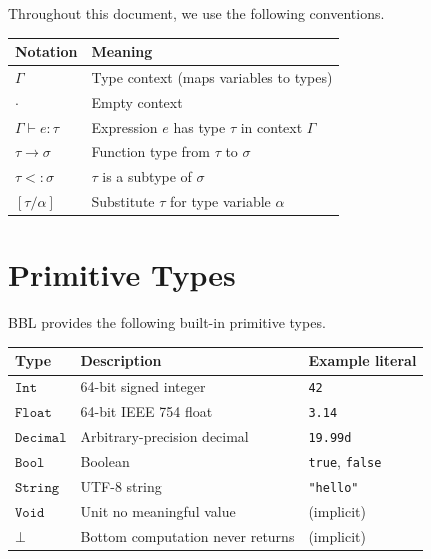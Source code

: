 \documentclass[11pt, letterpaper]{article}
\newcommand{\hastype}[3]{#1 \vdash #2 : #3}
\newcommand{\ctx}{\Gamma}
\newcommand{\emptyctx}{\cdot}
\newcommand{\tvar}{\alpha}          %
\newcommand{\typ}{\tau}             %
\newcommand{\typB}{\sigma}          %
\newcommand{\tInt}{\mathtt{Int}}
\newcommand{\tFloat}{\mathtt{Float}}
\newcommand{\tDecimal}{\mathtt{Decimal}}
\newcommand{\tBool}{\mathtt{Bool}}
\newcommand{\tString}{\mathtt{String}}
\newcommand{\tVoid}{\mathtt{Void}}
\newcommand{\tBottom}{\bot}
\newcommand{\tarrow}[2]{#1 \to #2}             %
\newcommand{\subtype}{\mathrel{<:}}
\newcommand{\subst}[2]{[#1 / #2]}
\begin{document}
Throughout this document, we use the following conventions.

\begin{center}
\begin{tabular}{ll}
  \toprule
  \textbf{Notation} & \textbf{Meaning} \\
  \midrule
  $\ctx$                          & Type context (maps variables to types) \\
  $\emptyctx$                     & Empty context \\
  $\hastype{\ctx}{e}{\typ}$       & Expression $e$ has type $\typ$ in context $\ctx$ \\
  $\tarrow{\typ}{\typB}$          & Function type from $\typ$ to $\typB$ \\
  $\typ \subtype \typB$           & $\typ$ is a subtype of $\typB$ \\
  $\subst{\typ}{\tvar}$           & Substitute $\typ$ for type variable $\tvar$ \\
  \bottomrule
\end{tabular}
\end{center}

\section{Primitive Types}

BBL provides the following built-in primitive types.

\begin{center}
\begin{tabular}{lll}
  \toprule
  \textbf{Type} & \textbf{Description} & \textbf{Example literal} \\
  \midrule
  $\tInt$     & 64-bit signed integer            & \lstinline|42| \\
  $\tFloat$   & 64-bit IEEE 754 float            & \lstinline|3.14| \\
  $\tDecimal$ & Arbitrary-precision decimal      & \lstinline|19.99d| \\
  $\tBool$    & Boolean                          & \lstinline|true|, \lstinline|false| \\
  $\tString$  & UTF-8 string                     & \lstinline|"hello"| \\
  $\tVoid$    & Unit  no meaningful value       & (implicit) \\
  $\tBottom$  & Bottom  computation never returns & (implicit) \\
  \bottomrule
\end{tabular}
\end{center}
\end{document}
